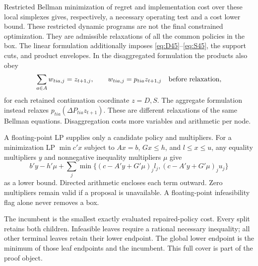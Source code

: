 Restricted Bellman minimization of regret and implementation cost over these local simplexes gives, respectively, a necessary operating test and a cost lower bound. These restricted dynamic programs are not the final constrained optimization. They are admissible relaxations of all the common policies in the box. The linear formulation additionally imposes \eqref{eq:D45}--\eqref{eq:S45}, the support cuts, and product envelopes. In the disaggregated formulation the products also obey
\begin{equation}\label{eq:simplexRLT45}
 \sum_{a\in A} w_{tia,j}=z_{t+1,j},\qquad w_{tia,j}=p_{tia}z_{t+1,j}
 \quad\hbox{before relaxation},
\end{equation}
for each retained continuation coordinate $z=D,S$. The aggregate formulation instead relaxes $p_{tia}(\Delta P_{tia}z_{t+1})$. These are different relaxations of the same Bellman equations. Disaggregation costs more variables and arithmetic per node.

A floating-point LP supplies only a candidate policy and multipliers. For a minimization LP $\min c'x$ subject to $Ax=b$, $Gx\le h$, and $l\le x\le u$, any equality multipliers $y$ and nonnegative inequality multipliers $\mu$ give
\begin{equation}\label{eq:dual45}
 b'y-h'\mu+\sum_j\min\{(c-A'y+G'\mu)_j l_j,
                              (c-A'y+G'\mu)_j u_j\}
\end{equation}
as a lower bound. Directed arithmetic encloses each term outward. Zero multipliers remain valid if a proposal is unavailable. A floating-point infeasibility flag alone never removes a box.

The incumbent is the smallest exactly evaluated repaired-policy cost. Every split retains both children. Infeasible leaves require a rational necessary inequality; all other terminal leaves retain their lower endpoint. The global lower endpoint is the minimum of those leaf endpoints and the incumbent. This full cover is part of the proof object.

